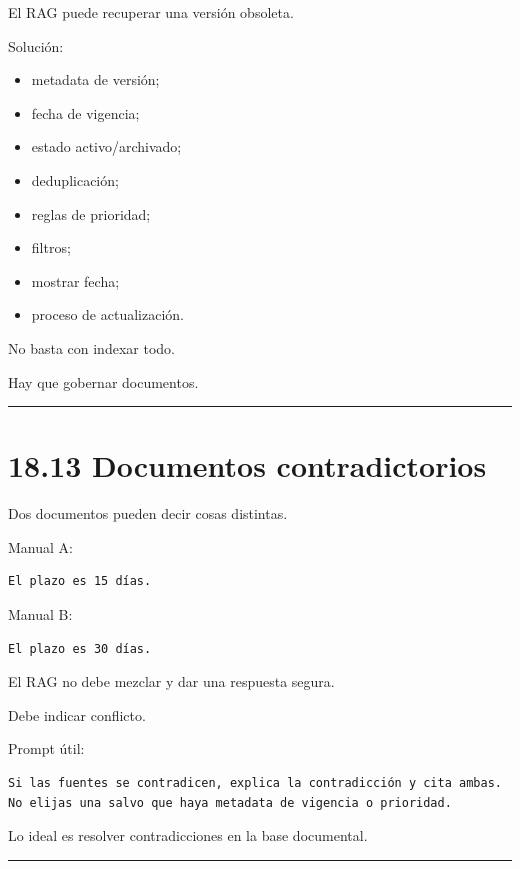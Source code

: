 El RAG puede recuperar una versión obsoleta.

Solución:

\begin{itemize}
\tightlist
\item
  metadata de versión;
\item
  fecha de vigencia;
\item
  estado activo/archivado;
\item
  deduplicación;
\item
  reglas de prioridad;
\item
  filtros;
\item
  mostrar fecha;
\item
  proceso de actualización.
\end{itemize}

No basta con indexar todo.

Hay que gobernar documentos.

\begin{center}\rule{0.5\linewidth}{0.5pt}\end{center}

\section{18.13 Documentos
contradictorios}\label{documentos-contradictorios}

Dos documentos pueden decir cosas distintas.

Manual A:

\begin{lstlisting}
El plazo es 15 días.
\end{lstlisting}

Manual B:

\begin{lstlisting}
El plazo es 30 días.
\end{lstlisting}

El RAG no debe mezclar y dar una respuesta segura.

Debe indicar conflicto.

Prompt útil:

\begin{lstlisting}
Si las fuentes se contradicen, explica la contradicción y cita ambas.
No elijas una salvo que haya metadata de vigencia o prioridad.
\end{lstlisting}

Lo ideal es resolver contradicciones en la base documental.

\begin{center}\rule{0.5\linewidth}{0.5pt}\end{center}

